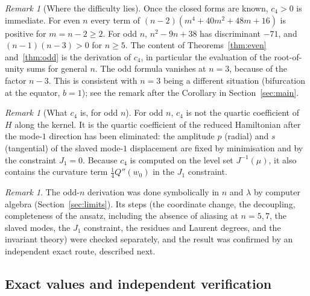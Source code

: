 \documentclass[11pt]{article}
\theoremstyle{definition}
\theoremstyle{remark}
\newtheorem{remark}[theorem]{Remark}
\begin{document}
\begin{remark}[Where the difficulty lies]\label{rem:positivity}
Once the closed forms are known, $c_4>0$ is immediate. For even $n$ every term of
$(n-2)(m^4+40m^2+48m+16)$ is positive for $m=n-2\ge2$. For odd $n$, $n^2-9n+38$ has discriminant $-71$, and
$(n-1)(n-3)>0$ for $n\ge5$. The content of Theorems~\ref{thm:even} and~\ref{thm:odd} is the derivation of
$c_4$, in particular the evaluation of the root-of-unity sums for general $n$. The odd formula vanishes at $n=3$, because of the factor $n-3$. This is
consistent with $n=3$ being a different situation (bifurcation at the equator, $b=1$); see the remark after
the Corollary in Section~\ref{sec:main}.
\end{remark}

\begin{remark}[What $c_4$ is, for odd $n$]\label{rem:reduced}
For odd $n$, $c_4$ is not the quartic coefficient of $H$ along the kernel. It is the quartic coefficient of
the reduced Hamiltonian after the mode-$1$ direction has been eliminated: the amplitude $p$ (radial) and $s$
(tangential) of the slaved mode-$1$ displacement are fixed by minimisation and by the constraint $J_1=0$.
Because $c_4$ is computed on the level set $J^{-1}(\mu)$, it also contains the curvature term
$\tfrac14Q''(w_0)$ in the $J_1$ constraint.
\end{remark}

\begin{remark}
The odd-$n$ derivation was done symbolically in $n$ and $\lambda$ by computer algebra
(Section~\ref{sec:limits}). Its steps (the coordinate change, the decoupling, completeness of the ansatz,
including the absence of aliasing at $n=5,7$, the slaved modes, the $J_1$ constraint, the residues and
Laurent degrees, and the invariant theory) were checked separately, and the result was confirmed by an
independent exact route, described next.
\end{remark}

\subsection{Exact values and independent verification}
\end{document}
